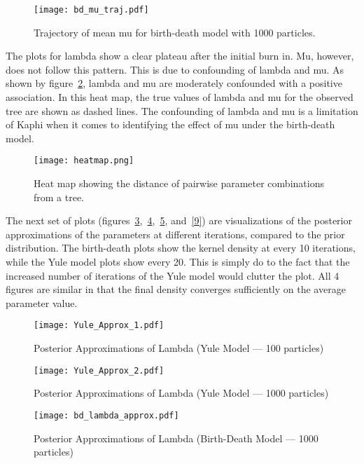 \documentclass[12pt]{article}
\begin{document}
\begin{figure}[ht]
\texttt{[image: bd\_mu\_traj.pdf]}
\caption[Trajectory of mu (birth-death)]{Trajectory of mean mu for birth-death model with 1000 particles.}
\centering
\label{4}
\end{figure}

	The plots for lambda show a clear plateau after the initial burn in. Mu, however, does not follow this pattern. This is due to confounding of lambda and mu. As shown by figure~\ref{5}, lambda and mu are moderately confounded with a positive association. In this heat map, the true values of lambda and mu for the observed tree are shown as dashed lines. The confounding of lambda and mu is a limitation of Kaphi when it comes to identifying the effect of mu under the birth-death model.

\begin{figure}[ht]
\texttt{[image: heatmap.png]}
\caption[Heat map]{Heat map showing the distance of pairwise parameter combinations from a tree.}
\centering
\label{5}
\end{figure}

	The next set of plots (figures~\ref{6},~\ref{7},~\ref{8}, and~\ref{9}) are visualizations of the posterior approximations of the parameters at different iterations, compared to the prior distribution. The birth-death plots show the kernel density at every 10 iterations, while the Yule model plots show every 20. This is simply do to the fact that the increased number of iterations of the Yule model would clutter the plot. All 4 figures are similar in that the final density converges sufficiently on the average parameter value. 

\begin{figure}[ht]
\texttt{[image: Yule\_Approx\_1.pdf]}
\caption[Approximation of lambda (Yule, 100 particles)]{Posterior Approximations of Lambda (Yule Model — 100 particles)}
\centering
\label{6}
\end{figure}

\begin{figure}[ht]
\texttt{[image: Yule\_Approx\_2.pdf]}
\caption[Approximation of lambda (Yule, 1000 particles)]{Posterior Approximations of Lambda (Yule Model — 1000 particles)}
\centering
\label{7}
\end{figure}


\begin{figure}[ht]
\texttt{[image: bd\_lambda\_approx.pdf]}
\caption[Approximation of lambda (birth-death)]{Posterior Approximations of Lambda (Birth-Death Model — 1000 particles)}
\centering
\label{8}
\end{figure}
\end{document}
